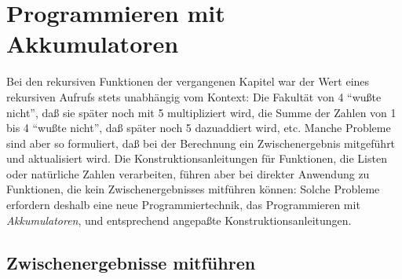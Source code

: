 
\chapter{Programmieren mit Akkumulatoren}
\label{cha:accu}

Bei den rekursiven Funktionen der vergangenen Kapitel war der Wert
eines rekursiven Aufrufs stets unabhängig vom Kontext: Die Fakultät
von 4 "`wußte nicht"', daß sie später noch mit 5 multipliziert wird,
die Summe der Zahlen von 1 bis 4 "`wußte nicht"', daß später noch 5
dazuaddiert wird, etc.  Manche Probleme sind aber so formuliert, daß
bei der Berechnung ein Zwischenergebnis mitgeführt und aktualisiert
wird.  Die Konstruktionsanleitungen für Funktionen, die Listen oder
natürliche Zahlen verarbeiten, führen aber bei direkter Anwendung zu
Funktionen, die kein Zwischenergebnisses mitführen können: Solche
Probleme erfordern deshalb eine neue Programmiertechnik, das
Programmieren mit \textit{Akkumulatoren}, und entsprechend angepaßte
Konstruktionsanleitungen.


\section{Zwischenergebnisse mitführen}
\label{sec:intermediate-results}

